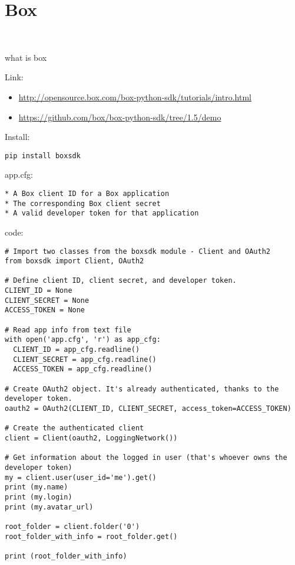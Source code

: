 \section{Box}\label{box}

\FILENAME\

what is box

Link:

\begin{itemize}

\item
  \url{http://opensource.box.com/box-python-sdk/tutorials/intro.html}
\item
  \url{https://github.com/box/box-python-sdk/tree/1.5/demo}
\end{itemize}

Install:

\begin{verbatim}
pip install boxsdk
\end{verbatim}

app.cfg:

\begin{verbatim}
* A Box client ID for a Box application
* The corresponding Box client secret
* A valid developer token for that application
\end{verbatim}

code:

\begin{verbatim}
# Import two classes from the boxsdk module - Client and OAuth2
from boxsdk import Client, OAuth2

# Define client ID, client secret, and developer token.
CLIENT_ID = None
CLIENT_SECRET = None
ACCESS_TOKEN = None

# Read app info from text file
with open('app.cfg', 'r') as app_cfg:
  CLIENT_ID = app_cfg.readline()
  CLIENT_SECRET = app_cfg.readline()
  ACCESS_TOKEN = app_cfg.readline()

# Create OAuth2 object. It's already authenticated, thanks to the developer token.
oauth2 = OAuth2(CLIENT_ID, CLIENT_SECRET, access_token=ACCESS_TOKEN)

# Create the authenticated client
client = Client(oauth2, LoggingNetwork())

# Get information about the logged in user (that's whoever owns the developer token)
my = client.user(user_id='me').get()
print (my.name)
print (my.login)
print (my.avatar_url)

root_folder = client.folder('0')
root_folder_with_info = root_folder.get()

print (root_folder_with_info)
\end{verbatim}

